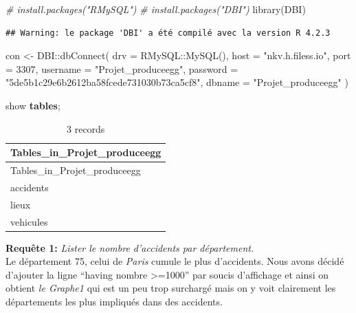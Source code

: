 \documentclass[mstat,12pt]{unswthesis}
\newenvironment{Shaded}{\begin{snugshade}}{\end{snugshade}}
\newcommand{\AttributeTok}[1]{\textcolor[rgb]{0.77,0.63,0.00}{#1}}
\newcommand{\CommentTok}[1]{\textcolor[rgb]{0.56,0.35,0.01}{\textit{#1}}}
\newcommand{\DecValTok}[1]{\textcolor[rgb]{0.00,0.00,0.81}{#1}}
\newcommand{\FunctionTok}[1]{\textcolor[rgb]{0.00,0.00,0.00}{#1}}
\newcommand{\KeywordTok}[1]{\textcolor[rgb]{0.13,0.29,0.53}{\textbf{#1}}}
\newcommand{\NormalTok}[1]{#1}
\newcommand{\OtherTok}[1]{\textcolor[rgb]{0.56,0.35,0.01}{#1}}
\newcommand{\SpecialCharTok}[1]{\textcolor[rgb]{0.00,0.00,0.00}{#1}}
\newcommand{\StringTok}[1]{\textcolor[rgb]{0.31,0.60,0.02}{#1}}
\begin{document}
\scriptsize

\begin{Shaded}
\begin{Highlighting}[]
\CommentTok{\# install.packages("RMySQL")}
\CommentTok{\# install.packages("DBI")}
\FunctionTok{library}\NormalTok{(DBI)}
\end{Highlighting}
\end{Shaded}

\begin{verbatim}
## Warning: le package 'DBI' a été compilé avec la version R 4.2.3
\end{verbatim}

\begin{Shaded}
\begin{Highlighting}[]
\NormalTok{con }\OtherTok{\textless{}{-}}\NormalTok{ DBI}\SpecialCharTok{::}\FunctionTok{dbConnect}\NormalTok{(}
  \AttributeTok{drv =}\NormalTok{ RMySQL}\SpecialCharTok{::}\FunctionTok{MySQL}\NormalTok{(),    }
  \AttributeTok{host =} \StringTok{"nkv.h.filess.io"}\NormalTok{, }
  \AttributeTok{port =} \DecValTok{3307}\NormalTok{,               }
  \AttributeTok{username =} \StringTok{"Projet\_produceegg"}\NormalTok{, }
  \AttributeTok{password =} \StringTok{"5de5b1c29e6b2612ba58fcede731030b73ca5cf8"}\NormalTok{, }
  \AttributeTok{dbname =} \StringTok{"Projet\_produceegg"}    
\NormalTok{)}
\end{Highlighting}
\end{Shaded}

\begin{Shaded}
\begin{Highlighting}[]

\NormalTok{show }\KeywordTok{tables}\NormalTok{;}
\end{Highlighting}
\end{Shaded}

\begin{longtable}[]{@{}l@{}}
\caption{3 records}\tabularnewline
\toprule()
Tables\_in\_Projet\_produceegg \\
\midrule()
\endfirsthead
\toprule()
Tables\_in\_Projet\_produceegg \\
\midrule()
\endhead
accidents \\
lieux \\
vehicules \\
\bottomrule()
\end{longtable}

\medskip
\normalsize

\textbf{Requête 1:} \emph{Lister le nombre d'accidents par
département.}\\
Le département 75, celui de \emph{Paris} cumule le plus d'accidents.
Nous avons décidé d'ajouter la ligne ``having nombre \textgreater=1000''
par soucis d'affichage et ainsi on obtient \emph{le Graphe1} qui est un
peu trop surchargé mais on y voit clairement les départements les plus
impliqués dans des accidents. \medskip
\end{document}
